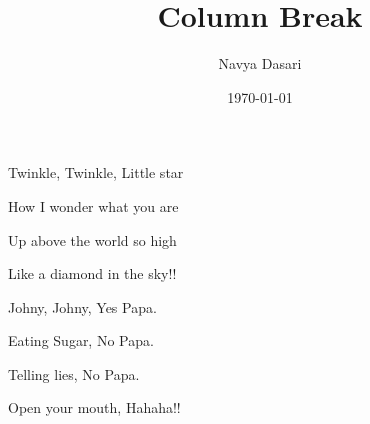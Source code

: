 \documentclass{article}
\title{Column Break}
\author{Navya Dasari}
\date{\today}
\begin{document}
	\maketitle
	\setlength{\columnsep}{25pt}
	\setlength{\columnseprule}{2pt}
	
	\begin{multicols}{2}
		
		Twinkle, Twinkle, Little star
		
		How I wonder what you are
		
		Up above the world so high
		
		Like a diamond in the sky!!
		
		\columnbreak
		
		Johny, Johny, Yes Papa.
		
		Eating Sugar, No Papa.
		
		Telling lies, No Papa.
		
		Open your mouth, Hahaha!!
		
	\end{multicols}
	
\end{document}
